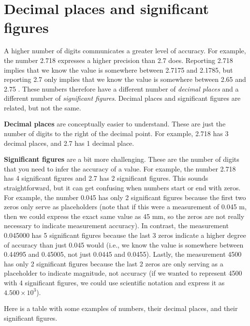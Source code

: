 \documentclass[
]{scrbook}
\begin{document}
\hypertarget{decimal-places-and-significant-figures}{%
\section{Decimal places and significant figures}\label{decimal-places-and-significant-figures}}

A higher number of digits communicates a greater level of accuracy.
For example, the number 2.718 expresses a higher precision than 2.7 does.
Reporting 2.718 implies that we know the value is somewhere between 2.7175 and 2.1785, but reporting 2.7 only implies that we know the value is somewhere between 2.65 and 2.75 \citep{Sokal1995}.
These numbers therefore have a different number of \emph{decimal places} and a different number of \emph{significant figures}.
Decimal places and significant figures are related, but not the same.

\textbf{Decimal places} are conceptually easier to understand. These are just the number of digits to the right of the decimal point. For example, 2.718 has 3 decimal places, and 2.7 has 1 decimal place.

\textbf{Significant figures} are a bit more challenging.
These are the number of digits that you need to infer the accuracy of a value.
For example, the number 2.718 has 4 significant figures and 2.7 has 2 significant figures. This sounds straightforward, but it can get confusing when numbers start or end with zeros.
For example, the number 0.045 has only 2 significant figures because the first two zeros only serve as placeholders (note that if this were a measurement of 0.045 m, then we could express the exact same value as 45 mm, so the zeros are not really necessary to indicate measurement accuracy).
In contrast, the measurement 0.045000 has 5 significant figures because the last 3 zeros indicate a higher degree of accuracy than just 0.045 would (i.e., we know the value is somewhere between 0.44995 and 0.45005, not just 0.0445 and 0.0455).
Lastly, the measurement 4500 has only 2 significant figures because the last 2 zeros are only serving as a placeholder to indicate magnitude, not accuracy (if we wanted to represent 4500 with 4 significant figures, we could use scientific notation and express it as \(4.500 \times 10^3\)).

Here is a table with some examples of numbers, their decimal places, and their significant figures.
\end{document}
